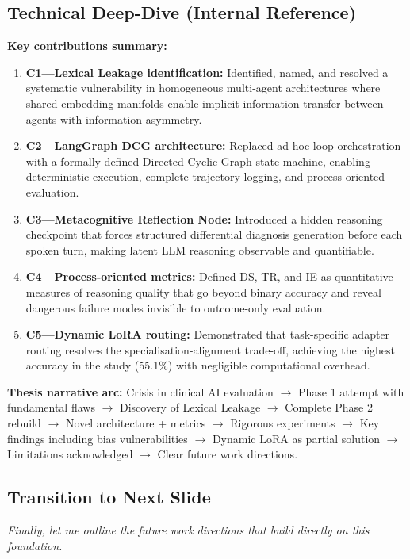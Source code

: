 \documentclass[12pt]{article}
\begin{document}
  \subsection*{Technical Deep-Dive (Internal Reference)}
  {\color{techgray}
  \textbf{Key contributions summary:}
  \begin{enumerate}
    \item \textbf{C1---Lexical Leakage identification:} Identified, named, and resolved a systematic vulnerability in homogeneous multi-agent architectures where shared embedding manifolds enable implicit information transfer between agents with information asymmetry.
    \item \textbf{C2---LangGraph DCG architecture:} Replaced ad-hoc loop orchestration with a formally defined Directed Cyclic Graph state machine, enabling deterministic execution, complete trajectory logging, and process-oriented evaluation.
    \item \textbf{C3---Metacognitive Reflection Node:} Introduced a hidden reasoning checkpoint that forces structured differential diagnosis generation before each spoken turn, making latent LLM reasoning observable and quantifiable.
    \item \textbf{C4---Process-oriented metrics:} Defined DS, TR, and IE as quantitative measures of reasoning quality that go beyond binary accuracy and reveal dangerous failure modes invisible to outcome-only evaluation.
    \item \textbf{C5---Dynamic LoRA routing:} Demonstrated that task-specific adapter routing resolves the specialisation-alignment trade-off, achieving the highest accuracy in the study (55.1\%) with negligible computational overhead.
  \end{enumerate}

  \textbf{Thesis narrative arc:} Crisis in clinical AI evaluation $\to$ Phase 1 attempt with fundamental flaws $\to$ Discovery of Lexical Leakage $\to$ Complete Phase 2 rebuild $\to$ Novel architecture + metrics $\to$ Rigorous experiments $\to$ Key findings including bias vulnerabilities $\to$ Dynamic LoRA as partial solution $\to$ Limitations acknowledged $\to$ Clear future work directions.
  }

  \subsection*{Transition to Next Slide}
  {\color{transgreen}
  \textit{Finally, let me outline the future work directions that build directly on this foundation.}
  }
\end{document}
